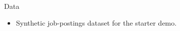 \begin{frame}{Data}
\begin{itemize}
\item Synthetic job-postings dataset for the starter demo.
\end{itemize}
\end{frame}
